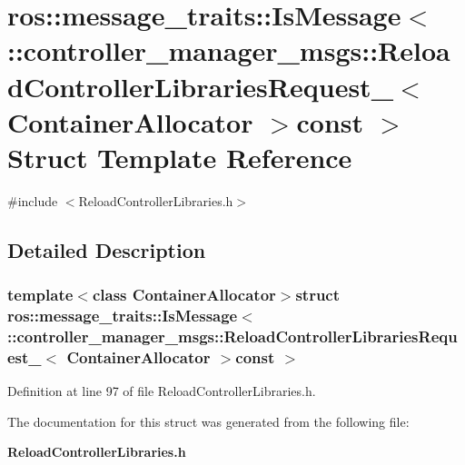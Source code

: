 \section{ros\-:\-:message\-\_\-traits\-:\-:\-Is\-Message$<$ \-:\-:controller\-\_\-manager\-\_\-msgs\-:\-:\-Reload\-Controller\-Libraries\-Request\-\_\-$<$ \-Container\-Allocator $>$const $>$ \-Struct \-Template \-Reference}
\label{structros_1_1message__traits_1_1IsMessage_3_01_1_1controller__manager__msgs_1_1ReloadControllerLe143125a80e771f014ee6f187a40c7b8}


{\ttfamily \#include $<$\-Reload\-Controller\-Libraries.\-h$>$}



\subsection{\-Detailed \-Description}
\subsubsection*{template$<$class Container\-Allocator$>$struct ros\-::message\-\_\-traits\-::\-Is\-Message$<$ \-::controller\-\_\-manager\-\_\-msgs\-::\-Reload\-Controller\-Libraries\-Request\-\_\-$<$ Container\-Allocator $>$const  $>$}



\-Definition at line 97 of file \-Reload\-Controller\-Libraries.\-h.



\-The documentation for this struct was generated from the following file\-:\begin{DoxyCompactItemize}
\item 
{\bf \-Reload\-Controller\-Libraries.\-h}\end{DoxyCompactItemize}
